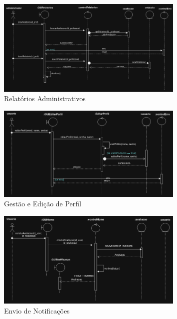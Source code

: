 \documentclass[12pt]{article}
\begin{document}
\begin{figure}[H]
    \centering
    \includegraphics[width=0.8\textwidth]{diagramas/i5-relatorios-admin.png}
    \caption{Relatórios Administrativos}
    \label{fig:i5-relatorios-admin}
\end{figure}

\begin{figure}[H]
    \centering
    \includegraphics[width=0.8\textwidth]{diagramas/i6-gestao-editar-perfil.png}
    \caption{Gestão e Edição de Perfil}
    \label{fig:i6-gestao-editar-perfil}
\end{figure}

\begin{figure}[H]
    \centering
    \includegraphics[width=0.8\textwidth]{diagramas/i7-enviar-notificacoes.png}
    \caption{Envio de Notificações}
    \label{fig:i7-enviar-notificacoes}
\end{figure}
\end{document}
